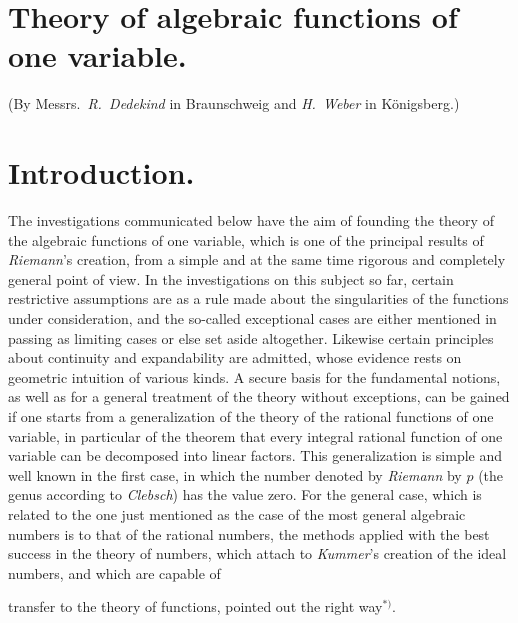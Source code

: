 \documentclass{article}
\begin{document}

\section*{Theory of algebraic functions of one variable.}

(By Messrs.\ \emph{R.\ Dedekind} in Braunschweig and \emph{H.\ Weber} in Königsberg.)

\section*{Introduction.}

The investigations communicated below have the aim of founding the theory of the algebraic functions of one variable, which is one of the principal results of \emph{Riemann}'s creation, from a simple and at the same time rigorous and completely general point of view. In the investigations on this subject so far, certain restrictive assumptions are as a rule made about the singularities of the functions under consideration, and the so-called exceptional cases are either mentioned in passing as limiting cases or else set aside altogether. Likewise certain principles about continuity and expandability are admitted, whose evidence rests on geometric intuition of various kinds. A secure basis for the fundamental notions, as well as for a general treatment of the theory without exceptions, can be gained if one starts from a generalization of the theory of the rational functions of one variable, in particular of the theorem that every integral rational function of one variable can be decomposed into linear factors. This generalization is simple and well known in the first case, in which the number denoted by \emph{Riemann} by $p$ (the genus according to \emph{Clebsch}) has the value zero. For the general case, which is related to the one just mentioned as the case of the most general algebraic numbers is to that of the rational numbers, the methods applied with the best success in the theory of numbers, which attach to \emph{Kummer}'s creation of the ideal numbers, and which are capable of

transfer to the theory of functions, pointed out the right way${}^{*)}$.
\end{document}
